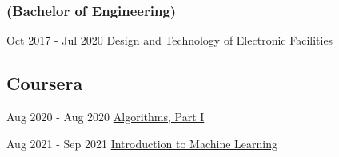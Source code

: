 \documentclass{article}
\begin{document}
\subsubsection*{(Bachelor of Engineering)}
Oct 2017 - Jul 2020
Design and Technology of Electronic Facilities

\subsection*{Coursera}
Aug 2020 - Aug 2020
\href{https://www.coursera.org/learn/algorithms-part1}{Algorithms, Part I}

Aug 2021 - Sep 2021
\href{https://www.coursera.org/learn/vvedenie-mashinnoe-obuchenie}{Introduction to Machine Learning}
\end{document}
